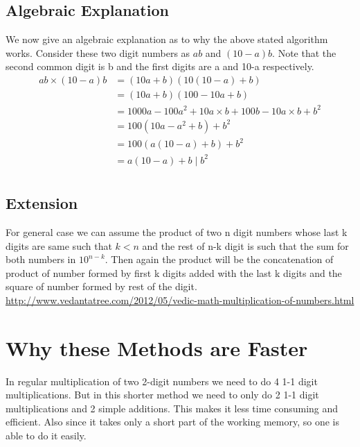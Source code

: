 \documentclass{article}
\begin{document}
\subsection{Algebraic Explanation}
We now give an algebraic explanation as to why the above stated algorithm works. Consider these two digit numbers as $ab$ and $(10-a)b$. Note that the second common digit is b and the first digits are a and 10-a respectively.
\begin{align*}
    ab  \times  (10-a)b & = ( 10a + b )( 10(10 - a) + b ) \\
                 & = ( 10a + b )( 100 - 10a + b ) \\
                 & = 1000a - 100a^2 + 10a \times b + 100b - 10a \times b + b^2 \\
                 & = 100(10a - a^2 + b) + b^2 \\
                 & = 100(a(10 - a) + b) + b^2 \\
                 & = a(10 - a) + b \; | \; b^2 \\   
\end{align*}
\subsection{Extension}
For general case we can assume the product of two n digit numbers whose last k digits are same such that $k < n$ and the rest of n-k digit is such that the sum for both numbers in $ {10}^{n-k} $. Then again the product will be the concatenation of product of number formed by first k digits added with the last k digits and the square of number formed by rest of the digit.
\url {http://www.vedantatree.com/2012/05/vedic-math-multiplication-of-numbers.html}

\section{Why these Methods are Faster}
In regular multiplication of two 2-digit numbers we need to do 4 1-1 digit multiplications. But in this shorter method we need to only do 2 1-1 digit multiplications and 2 simple additions. This makes it less time consuming and efficient. Also since it takes only a short part of the working memory, so one is able to do it easily.




\end{document}
